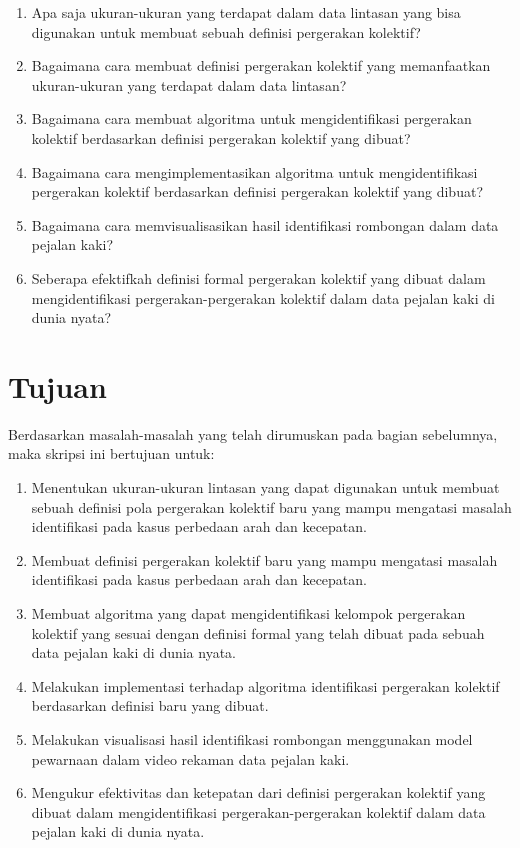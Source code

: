 \fi
\begin{enumerate}
    \item Apa saja ukuran-ukuran yang terdapat dalam data lintasan yang bisa digunakan untuk membuat sebuah definisi pergerakan kolektif?
    \item Bagaimana cara membuat definisi pergerakan kolektif yang memanfaatkan ukuran-ukuran yang terdapat dalam data lintasan?
    \item Bagaimana cara membuat algoritma untuk mengidentifikasi pergerakan kolektif berdasarkan definisi pergerakan kolektif yang dibuat?
    \item Bagaimana cara mengimplementasikan algoritma untuk mengidentifikasi pergerakan kolektif berdasarkan definisi pergerakan kolektif yang dibuat?
    \item Bagaimana cara memvisualisasikan hasil identifikasi rombongan dalam data pejalan kaki?
    \item Seberapa efektifkah definisi formal pergerakan kolektif yang dibuat dalam mengidentifikasi pergerakan-pergerakan kolektif dalam data pejalan kaki di dunia nyata?
\end{enumerate}

\section{Tujuan}
\label{sec:tujuan}  

Berdasarkan masalah-masalah yang telah dirumuskan pada bagian sebelumnya, maka skripsi ini bertujuan untuk:

\begin{enumerate}
    \item Menentukan ukuran-ukuran lintasan yang dapat digunakan untuk membuat sebuah definisi pola pergerakan kolektif baru yang mampu mengatasi masalah identifikasi pada kasus perbedaan arah dan kecepatan.
    \item Membuat definisi pergerakan kolektif baru yang mampu mengatasi masalah identifikasi pada kasus perbedaan arah dan kecepatan.
    \item Membuat algoritma yang dapat mengidentifikasi kelompok pergerakan kolektif yang sesuai dengan definisi formal yang telah dibuat pada sebuah data pejalan kaki di dunia nyata.
    \item Melakukan implementasi terhadap algoritma identifikasi pergerakan kolektif berdasarkan definisi baru yang dibuat.
    \item Melakukan visualisasi hasil identifikasi rombongan menggunakan model pewarnaan dalam video rekaman data pejalan kaki.
    \item Mengukur efektivitas dan ketepatan dari definisi pergerakan kolektif yang dibuat dalam mengidentifikasi pergerakan-pergerakan kolektif dalam data pejalan kaki di dunia nyata.
\end{enumerate}

